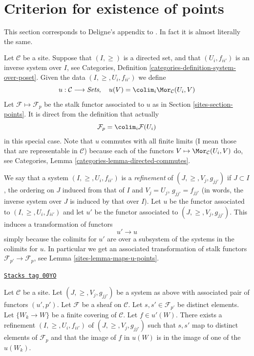 \section{Criterion for existence of points}
\label{sites-section-criterion-points}
This section corresponds to Deligne's appendix to \cite[Expos\'e VI]{SGA4}.
In fact it is almost literally the same.

\medskip\noindent
Let $\mathcal{C}$ be a site.
Suppose that $(I, \geq)$ is a directed set,
and that $(U_i, f_{ii'})$ is an inverse system over $I$, see
Categories, Definition \ref{categories-definition-system-over-poset}.
Given the data $(I, \geq, U_i, f_{ii'})$ we define
$$
u : \mathcal{C} \longrightarrow \textit{Sets}, \quad
u(V) = \colim_i \Mor_\mathcal{C}(U_i , V)
$$
Let $\mathcal{F} \mapsto \mathcal{F}_p$ be the stalk functor
associated to $u$ as in Section \ref{sites-section-points}.
It is direct from the definition that actually
$$
\mathcal{F}_p = \colim_i \mathcal{F}(U_i)
$$
in this special case.
Note that $u$ commutes with all finite limits (I mean those that
are representable in $\mathcal{C}$) because
each of the functors $V \mapsto \Mor_\mathcal{C}(U_i , V)$
do, see Categories, Lemma \ref{categories-lemma-directed-commutes}.

\medskip\noindent
We say that a system $(I, \geq, U_i, f_{ii'})$
is a {\it refinement} of $(J, \geq, V_j, g_{jj'})$ if
$J \subset I$, the ordering on $J$ induced from that of $I$
and $V_j = U_j$, $g_{jj'} = f_{jj'}$ (in words, the inverse system
over $J$ is induced by that over $I$). Let $u$ be the functor
associated to $(I, \geq, U_i, f_{ii'})$ and let $u'$ be the
functor associated to $(J, \geq, V_j, g_{jj'})$.
This induces a transformation of functors
$$
u' \longrightarrow u
$$
simply because the colimits for $u'$ are over a subsystem
of the systems in the colimits for $u$.
In particular we get an associated transformation of
stalk functors $\mathcal{F}_{p'} \to \mathcal{F}_p$,
see Lemma \ref{sites-lemma-maps-u-points}.

\begin{lemma}[Refine]
\label{sites-lemma-refine}
\href{https://stacks.math.columbia.edu/tag/00YO}{\texttt{Stacks tag 00YO}}

Let $\mathcal{C}$ be a site.
Let $(J, \geq, V_j, g_{jj'})$ be a system as above with associated
pair of functors $(u', p')$.
Let $\mathcal{F}$ be a sheaf on $\mathcal{C}$.
Let $s, s' \in \mathcal{F}_{p'}$ be distinct elements.
Let $\{W_k \to W\}$ be a finite covering of $\mathcal{C}$.
Let $f \in u'(W)$.
There exists a refinement $(I, \geq, U_i, f_{ii'})$
of $(J, \geq, V_j, g_{jj'})$ such that $s, s'$ map
to distinct elements of $\mathcal{F}_p$ and that
the image of $f$ in $u(W)$ is in the image of one of
the $u(W_k)$.
\end{lemma}

